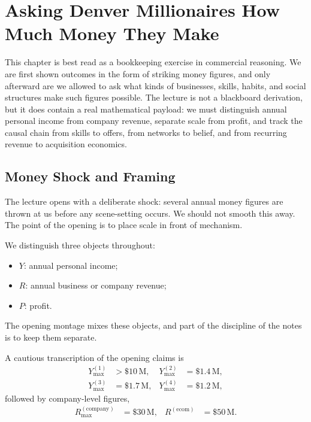 \chapter{Asking Denver Millionaires How Much Money They Make}

This chapter is best read as a bookkeeping exercise in commercial reasoning. We are first shown outcomes in the form of striking money figures, and only afterward are we allowed to ask what kinds of businesses, skills, habits, and social structures make such figures possible. The lecture is not a blackboard derivation, but it does contain a real mathematical payload: we must distinguish annual personal income from company revenue, separate scale from profit, and track the causal chain from skills to offers, from networks to belief, and from recurring revenue to acquisition economics.

\section{Money Shock and Framing}

The lecture opens with a deliberate shock: several annual money figures are thrown at us before any scene-setting occurs. We should not smooth this away. The point of the opening is to place scale in front of mechanism.

\begin{definition}
We distinguish three objects throughout:
\begin{itemize}
\item \(Y\): annual personal income;
\item \(R\): annual business or company revenue;
\item \(P\): profit.
\end{itemize}
The opening montage mixes these objects, and part of the discipline of the notes is to keep them separate.
\end{definition}

A cautious transcription of the opening claims is
\begin{align}
Y_{\max}^{(1)} &> \$10\,\mathrm{M}, &
Y_{\max}^{(2)} &= \$1.4\,\mathrm{M}, \\
Y_{\max}^{(3)} &= \$1.7\,\mathrm{M}, &
Y_{\max}^{(4)} &= \$1.2\,\mathrm{M},
\end{align}
followed by company-level figures,
\begin{align}
R_{\max}^{(\mathrm{company})} &= \$30\,\mathrm{M}, &
R^{(\mathrm{ecom})} &= \$50\,\mathrm{M}.
\end{align}

